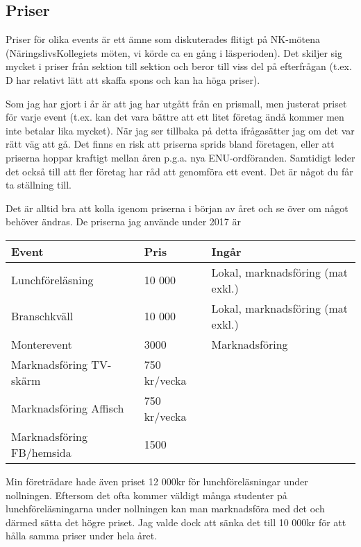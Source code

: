 \documentclass[10pt]{article}
\begin{document}
\subsection*{Priser}
Priser för olika events är ett ämne som diskuterades flitigt på NK-mötena (NäringslivsKollegiets
möten, vi körde ca en gång i läsperioden). Det skiljer sig mycket i priser från sektion till sektion och beror till viss del på efterfrågan (t.ex. D har relativt lätt att skaffa spons och kan ha höga priser).

Som jag har gjort i år är att jag har utgått från en prismall, men justerat priset för varje event (t.ex.
kan det vara bättre att ett litet företag ändå kommer men inte betalar lika mycket). När jag ser
tillbaka på detta ifrågasätter jag om det var rätt väg att gå. Det finns en risk att priserna sprids bland företagen, eller att priserna hoppar kraftigt mellan åren p.g.a. nya ENU-ordföranden. Samtidigt leder det också till att fler företag har råd att genomföra ett event. Det är något du får ta ställning till.

Det är alltid bra att kolla igenom priserna i början av året och se över om något behöver ändras. De priserna jag använde under 2017 är

\begin{center}
  \begin{tabular}{ | l | l | l |}
    \hline
    \textbf{Event} & \textbf{Pris} & \textbf{Ingår} \\ \hline
    Lunchföreläsning & 10 000  & Lokal, marknadsföring (mat exkl.) \\ \hline
    Branschkväll & 10 000 & Lokal, marknadsföring (mat exkl.) \\ \hline
    Monterevent & 3000 & Marknadsföring\\ \hline
    Marknadsföring TV-skärm & 750 kr/vecka & \\ \hline
    Marknadsföring Affisch & 750 kr/vecka & \\ \hline
    Marknadsföring FB/hemsida & 1500 & \\ \hline
  \end{tabular}
\end{center}

Min företrädare hade även priset 12 000kr för lunchföreläsningar under nollningen. Eftersom det ofta kommer väldigt många studenter på lunchföreläsningarna under nollningen kan man marknadsföra med det och därmed sätta det högre priset. Jag valde dock att sänka det till 10 000kr för att hålla samma priser under hela året.
\end{document}
